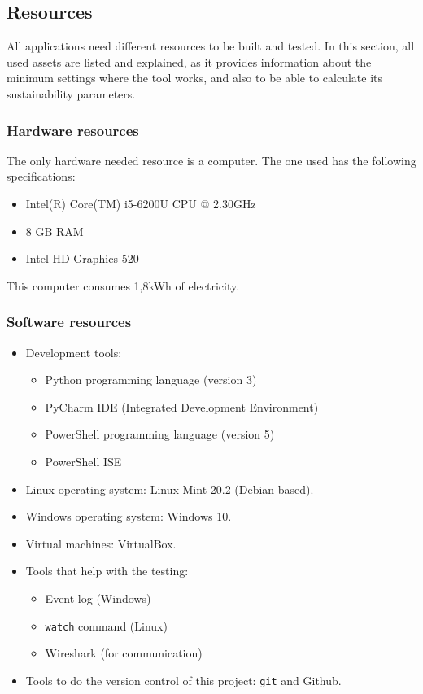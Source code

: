\subsection{Resources}
\label{ssec:resources}
All applications need different resources to be built and tested. In this section, all used assets are listed and explained, as it provides information about the minimum settings where the tool works, and also to be able to calculate its sustainability parameters.

\subsubsection{Hardware resources}
The only hardware needed resource is a computer. The one used has the following specifications:
\begin{itemize}
\item Intel(R) Core(TM) i5-6200U CPU @ 2.30GHz
\item 8 GB RAM
\item Intel HD Graphics 520
\end{itemize} 
This computer consumes 1,8kWh of electricity.

\subsubsection{Software resources}
\begin{itemize}
\item Development tools: 
\begin{itemize}
\item Python programming language (version 3)
\item PyCharm IDE (Integrated Development Environment)
\item PowerShell programming language (version 5)
\item PowerShell ISE
\end{itemize}
\item Linux operating system: Linux Mint 20.2 (Debian based).
\item Windows operating system: Windows 10.
\item Virtual machines: VirtualBox.
\item Tools that help with the testing:
\begin{itemize}
\item Event log (Windows)
\item \texttt{watch} command (Linux) 
\item Wireshark (for communication)
\end{itemize}
\item Tools to do the version control of this project: \texttt{git} and Github.
\end{itemize}

